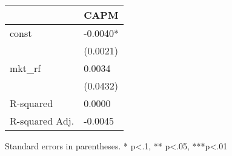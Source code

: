 \begin{table}
\caption{}
\label{}
\begin{center}
\begin{tabular}{ll}
\hline
               & CAPM      \\
\hline
const          & -0.0040*  \\
               & (0.0021)  \\
mkt\_rf        & 0.0034    \\
               & (0.0432)  \\
R-squared      & 0.0000    \\
R-squared Adj. & -0.0045   \\
\hline
\end{tabular}
\end{center}
\end{table}
\bigskip
Standard errors in parentheses. \newline 
* p<.1, ** p<.05, ***p<.01
